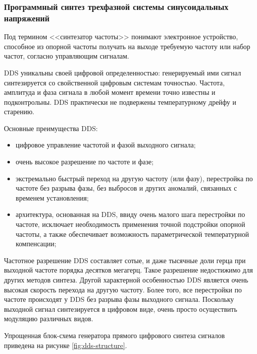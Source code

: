     \subsubsection{Программный синтез трехфазной системы синусоидальных напряжений}
        Под термином <<синтезатор частоты>> понимают электронное устройство,
        способное из опорной частоты получать на выходе требуемую частоту или
        набор частот,  согласно управляющим сигналам.

        DDS  уникальны своей цифровой определенностью:  генерируемый ими сигнал
        синтезируется со свойственной цифровым системам точностью.  Частота,
        амплитуда и фаза сигнала в любой момент времени точно известны и
        подконтрольны. DDS  практически не подвержены температурному дрейфу и
        старению.

        Основные преимущества DDS:  
        \begin{itemize}
            \item цифровое управление частотой и фазой выходного сигнала;
            \item очень высокое разрешение по частоте и фазе;
            \item экстремально быстрый переход на другую частоту (или фазу),
                перестройка по частоте без разрыва фазы,  без выбросов и других
                аномалий,  связанных с временем установления;
            \item архитектура,  основанная на DDS,  ввиду очень малого шага
                перестройки по частоте, исключает необходимость применения
                точной подстройки опорной частоты,  а также обеспечивает
                возможность параметрической температурной компенсации;
        \end{itemize}

        Частотное разрешение DDS  составляет сотые,  и даже тысячные доли герца
        при выходной частоте порядка десятков мегагерц.  Такое разрешение
        недостижимо для других методов синтеза. Другой характерной особенностью
        DDS  является очень высокая скорость перехода на другую частоту.  Более
        того,  все перестройки по частоте происходят у DDS  без разрыва фазы
        выходного сигнала.  Поскольку выходной сигнал синтезируется в цифровом
        виде,  очень просто осуществить модуляцию различных видов.

        Упрощенная блок-схема генератора прямого цифрового синтеза сигналов
        приведена на рисунке \ref{fig:dds-structure}. 


